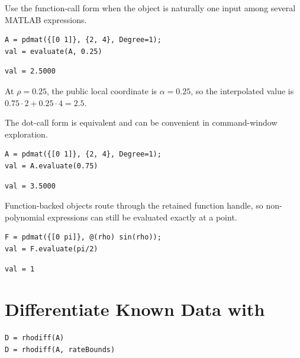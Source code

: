 \examplehead
Use the function-call form when the object is naturally one input among several MATLAB expressions.

\begin{lstlisting}[style=dpmatlab]
A = pdmat({[0 1]}, {2, 4}, Degree=1);
val = evaluate(A, 0.25)
\end{lstlisting}

\begin{lstlisting}[style=dpoutput]
val = 2.5000
\end{lstlisting}

At $\rho=0.25$, the public local coordinate is $\alpha=0.25$, so the interpolated value is $0.75\cdot2+0.25\cdot4=2.5$.

The dot-call form is equivalent and can be convenient in command-window exploration.

\begin{lstlisting}[style=dpmatlab]
A = pdmat({[0 1]}, {2, 4}, Degree=1);
val = A.evaluate(0.75)
\end{lstlisting}

\begin{lstlisting}[style=dpoutput]
val = 3.5000
\end{lstlisting}

Function-backed objects route through the retained function handle, so non-polynomial expressions can still be evaluated exactly at a point.

\begin{lstlisting}[style=dpmatlab]
F = pdmat({[0 pi]}, @(rho) sin(rho));
val = F.evaluate(pi/2)
\end{lstlisting}

\begin{lstlisting}[style=dpoutput]
val = 1
\end{lstlisting}

\enlargethispage{3\baselineskip}
\section{Differentiate Known Data with \texorpdfstring{}{rhodiff}}
\label{sec:pdmat-rhodiff}

\syntaxhead
\begin{lstlisting}[style=dpsyntax]
D = rhodiff(A)
D = rhodiff(A, rateBounds)
\end{lstlisting}


